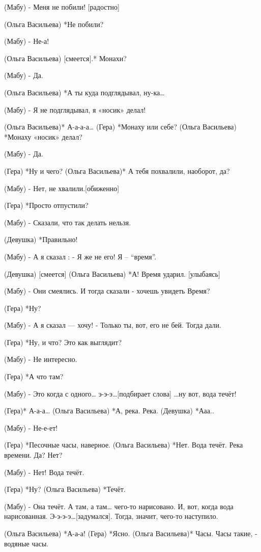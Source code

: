 (Мабу) - Меня не побили! [радостно]

(Ольга Васильева) *Не побили?

(Мабу) - Не-а! 

(Ольга Васильева) [смеется].* Монахи?

(Мабу) - Да. 

(Ольга Васильева) *А ты куда подглядывал, ну-ка…

(Мабу) - Я не подглядывал, я «носик» делал! 

(Ольга Васильева)* А-а-а-а…
(Гера) *Монаху или себе?
(Ольга Васильева) *Монаху «носик» делал? 

(Мабу) - Да.

(Гера) *Ну и чего?
(Ольга Васильева)* А тебя похвалили, наоборот, да?

(Мабу)  - Нет, не хвалили.[обиженно]

(Гера) *Просто отпустили?

(Мабу) - Сказали, что так делать нельзя.

(Девушка) *Правильно!

(Мабу) - А я сказал : - Я же не его! Я – “время”.

(Девушка) [смеется]
(Ольга Васильева) *А! Время ударил. [улыбаясь]

(Мабу) - Они смеялись. И тогда сказали - хочешь увидеть Время?

(Гера) *Ну?

(Мабу)  - А я сказал — хочу!  - Только ты, вот, его не бей. Тогда дали.

(Гера) *Ну, и что?  Это как выглядит?

(Мабу) - Не интересно.

(Гера) *А что там?

(Мабу) - Это когда с одного… э-э-э…[подбирает слова] …ну вот, вода течёт! 

(Гера)* А-а-а…
(Ольга Васильева) *А, река. Река.
(Девушка) *Ааа..

(Мабу)  - Не-е-ет!

(Гера) *Песочные часы, наверное.
(Ольга Васильева) *Нет. Вода течёт. Река времени. Да? Нет?

(Мабу) - Нет! Вода течёт.

(Гера) *Ну?
(Ольга Васильева) *Течёт.

(Мабу) - Она течёт. А там, а там… чего-то нарисовано. И, вот, когда вода нарисованная. Э-э-э-э…[задумался]. Тогда, значит, чего-то наступило. 

(Ольга Васильева) *А-а-а!
(Гера) *Ясно.
(Ольга Васильева)* Часы. Часы такие, - водяные часы.

